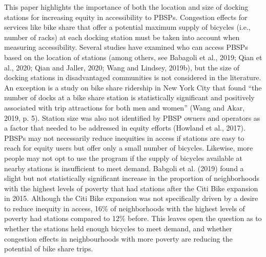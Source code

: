 \documentclass[]{elsarticle} %
\begin{document}
This paper highlights the importance of both the location and size of
docking stations for increasing equity in accessibility to PBSPs.
Congestion effects for services like bike share that offer a potential
maximum supply of bicycles (i.e., number of racks) at each docking
station must be taken into account when measuring accessibility. Several
studies have examined who can access PBSPs based on the location of
stations (among others, see Babagoli et al., 2019; Qian et al., 2020;
Qian and Jaller, 2020; Wang and Lindsey, 2019b), but the size of docking
stations in disadvantaged communities is not considered in the
literature. An exception is a study on bike share ridership in New York
City that found ``the number of docks at a bike share station is
statistically significant and positively associated with trip
attractions for both men and women'' (Wang and Akar, 2019, p. 5).
Station size was also not identified by PBSP owners and operators as a
factor that needed to be addressed in equity efforts (Howland et al.,
2017). PBSPs may not necessarily reduce inequities in access if stations
are easy to reach for equity users but offer only a small number of
bicycles. Likewise, more people may not opt to use the program if the
supply of bicycles available at nearby stations is insufficient to meet
demand. Babgoli et al. (2019) found a slight but not statistically
significant increase in the proportion of neighborhoods with the highest
levels of poverty that had stations after the Citi Bike expansion in
2015. Although the Citi Bike expansion was not specifically driven by a
desire to reduce inequity in access, 16\% of neighborhoods with the
highest levels of poverty had stations compared to 12\% before. This
leaves open the question as to whether the stations held enough bicycles
to meet demand, and whether congestion effects in neighbourhoods with
more poverty are reducing the potential of bike share trips.
\end{document}
